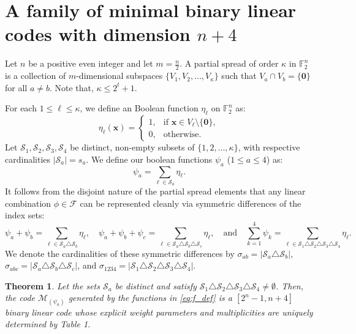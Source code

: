 \documentclass[10pt,a4paper]{amsart}
\newtheorem{theorem}{Theorem}%
\begin{document}
\section{A family of minimal binary linear codes with dimension $n+4$}

 Let $n$ be a positive even integer and let $m=\frac{n}{2}$. A partial spread of order $\kappa$ in $\mathbb{F}_2^n$ is a collection of $m$-dimensional subspaces $\{V_1, V_2, \ldots, V_\kappa\}$ such that $V_a \cap V_b = \{\mathbf{0}\}$ for all $a \neq b$. Note that, $\kappa\leq 2^{t}+1$.

For each $1 \leq \ell \leq \kappa$, we define an Boolean function $\eta_\ell$ on $\mathbb{F}_2^n$ as:
\begin{equation}\label{eq:g_def}
\eta_\ell(\mathbf{x})=
\begin{cases}
1, & \text{if } \mathbf{x} \in V_\ell \setminus \{\mathbf{0}\},\\
0, & \text{otherwise.}
\end{cases} \tag{3.1}
\end{equation}
Let $\mathcal{S}_1, \mathcal{S}_2, \mathcal{S}_3, \mathcal{S}_4$ be distinct, non-empty subsets of $\{1,2,\ldots,\kappa\}$, with respective cardinalities $|\mathcal{S}_a| = s_a$. We define our boolean functions $\psi_a$ ($1 \leq a \leq 4$) as:
\begin{equation}\label{eq:f_def}
\psi_a = \sum_{\ell \in \mathcal{S}_a} \eta_\ell. \tag{3.2}
\end{equation}
It follows from the disjoint nature of the partial spread elements that any linear combination $\phi \in \mathcal{F}$ can be represented cleanly via symmetric differences of the index sets:
\begin{equation}\label{eq:f_comb}
\psi_a+\psi_b=\sum_{\ell\in \mathcal{S}_a\triangle \mathcal{S}_b}\eta_\ell, \quad \psi_a+\psi_b+\psi_c=\sum_{\ell\in \mathcal{S}_a\triangle \mathcal{S}_b\triangle \mathcal{S}_c}\eta_\ell, \quad \text{and} \quad \sum_{k=1}^{4}\psi_k=\sum_{\ell\in \mathcal{S}_1\triangle \mathcal{S}_2\triangle \mathcal{S}_3\triangle \mathcal{S}_4}\eta_\ell. \tag{3.3}
\end{equation}
We denote the cardinalities of these symmetric differences by $\sigma_{ab} = |\mathcal{S}_a \triangle \mathcal{S}_b|$, $\sigma_{abc} = |\mathcal{S}_a \triangle \mathcal{S}_b \triangle \mathcal{S}_c|$, and $\sigma_{1234} = |\mathcal{S}_1 \triangle \mathcal{S}_2 \triangle \mathcal{S}_3 \triangle \mathcal{S}_4|$.

\begin{theorem}\label{Thm_Spread_Weight}
Let the  sets $\mathcal{S}_a$ be distinct and satisfy $\mathcal{S}_1 \triangle \mathcal{S}_2 \triangle \mathcal{S}_3 \triangle \mathcal{S}_4 \neq \emptyset$. Then, the code $\mathcal{M}_{(\psi_a)}$ generated by the functions in \eqref{eq:f_def} is a $[2^n-1, n+4]$ binary linear code whose explicit weight parameters and multiplicities are uniquely determined by Table 1.
\end{theorem}
\end{document}
